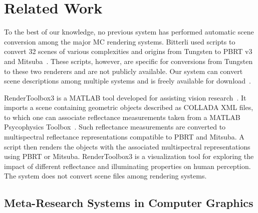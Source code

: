\section{Related Work}
\label{(sec:related_work)}

To the best of our knowledge, no previous system has performed automatic scene conversion among the major MC rendering systems. 
Bitterli used scripts to convert 32 scenes of various complexities and origins from Tungsten to PBRT v3 and Mitsuba~\cite{tungsten}. These scripts, however, are specific for conversions from Tungsten to these two renderers and are not publicly available. 
Our system can convert scene descriptions among multiple systems and is freely available for download~\cite{sceneConverter}.

RenderToolbox3 is a MATLAB tool developed for assisting vision research~\cite{rendertoolbox}. It imports a scene containing geometric objects described as COLLADA XML files, to which one can associate reflectance measurements taken from a MATLAB Psycophysics Toolbox~\cite{Brainard1997}. Such reflectance measurements are converted to multispectral reflectance representations compatible to PBRT and Mitsuba. A script then renders the objects with the associated multispectral representations using PBRT or Mitsuba. RenderToolbox3 is a visualization tool for exploring the impact of different reflectance and illuminating properties on human perception.       
The system does not 
convert scene files among rendering systems. 

\subsection{Meta-Research Systems in Computer Graphics}

